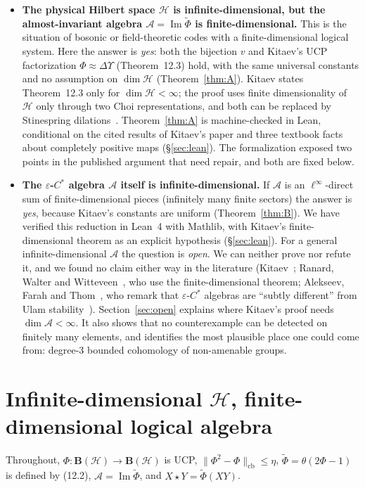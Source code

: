 \documentclass[11pt]{article}
\theoremstyle{remark}
\newcommand{\eps}{\varepsilon}
\newcommand{\cA}{\mathcal{A}}
\newcommand{\cH}{\mathcal{H}}
\newcommand{\Bo}{\mathbf{B}}
\newcommand{\cb}{\mathrm{cb}}
\newcommand{\Img}{\operatorname{Im}}
\newcommand{\wt}{\widetilde}
\begin{document}
\begin{itemize}
\item[(a)] \textbf{The physical Hilbert space $\cH$ is infinite-dimensional, but the almost-invariant algebra $\cA=\Img\wt\Phi$ is finite-dimensional.} This is the situation of bosonic or field-theoretic codes with a finite-dimensional logical system. Here the answer is \emph{yes}: both the bijection $v$ and Kitaev's UCP factorization $\Phi\approx\Delta\Upsilon$ (Theorem~12.3) hold, with the same universal constants and no assumption on $\dim\cH$ (Theorem~\ref{thm:A}). Kitaev states Theorem~12.3 only for $\dim\cH<\infty$; the proof uses finite dimensionality of $\cH$ only through two Choi representations, and both can be replaced by Stinespring dilations~\cite{Stinespring,Paulsen}. Theorem~\ref{thm:A} is machine-checked in Lean, conditional on the cited results of Kitaev's paper and three textbook facts about completely positive maps (\S\ref{sec:lean}). The formalization exposed two points in the published argument that need repair, and both are fixed below.
\item[(b)] \textbf{The $\eps$-$C^*$ algebra $\cA$ itself is infinite-dimensional.} If $\cA$ is an $\ell^\infty$-direct sum of finite-dimensional pieces (infinitely many finite sectors) the answer is \emph{yes}, because Kitaev's constants are uniform (Theorem~\ref{thm:B}). We have verified this reduction in Lean~4 with Mathlib, with Kitaev's finite-dimensional theorem as an explicit hypothesis (\S\ref{sec:lean}). For a general infinite-dimensional $\cA$ the question is \emph{open}. We can neither prove nor refute it, and we found no claim either way in the literature (Kitaev~\cite{Kitaev}; Ranard, Walter and Witteveen~\cite{RWW}, who use the finite-dimensional theorem; Alekseev, Farah and Thom~\cite{AFT}, who remark that $\eps$-$C^*$ algebras are ``subtly different'' from Ulam stability~\cite{Kazhdan,BOT}). Section~\ref{sec:open} explains where Kitaev's proof needs $\dim\cA<\infty$. It also shows that no counterexample can be detected on finitely many elements, and identifies the most plausible place one could come from: degree-3 bounded cohomology of non-amenable groups.
\end{itemize}

\section{Infinite-dimensional $\cH$, finite-dimensional logical algebra}

Throughout, $\Phi\colon\Bo(\cH)\to\Bo(\cH)$ is UCP, $\|\Phi^2-\Phi\|_\cb\le\eta$, $\wt\Phi=\theta(2\Phi-1)$ is defined by (12.2), $\cA=\Img\wt\Phi$, and $X\star Y=\wt\Phi(XY)$.
\end{document}
